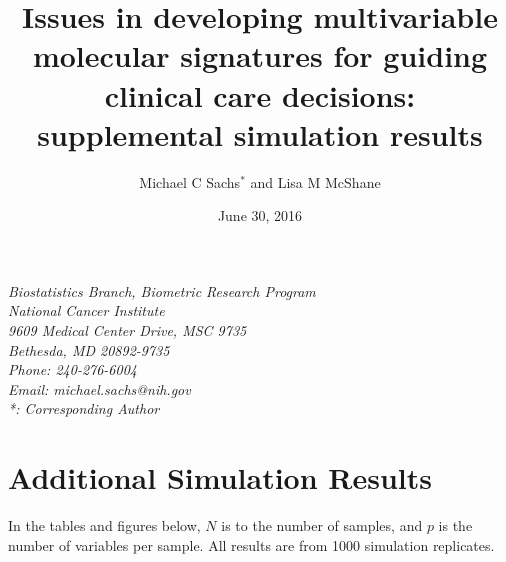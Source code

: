 \documentclass[11pt,]{article}
\title{Issues in developing multivariable molecular signatures for guiding
clinical care decisions: supplemental simulation results}
\author{Michael C Sachs$^*$ and Lisa M McShane}
\date{June 30, 2016}
\begin{document}
\maketitle

\begin{center}
\textit{Biostatistics Branch, Biometric Research Program \\
National Cancer Institute \\
9609 Medical Center Drive, MSC 9735 \\
Bethesda, MD 20892-9735 \\
Phone: 240-276-6004 \\
Email: michael.sachs@nih.gov \\
*: Corresponding Author}

\end{center}

\clearpage

\section{Additional Simulation
Results}\label{additional-simulation-results}

In the tables and figures below, \(N\) is to the number of samples, and
\(p\) is the number of variables per sample. All results are from 1000
simulation replicates.

\clearpage
\end{document}

